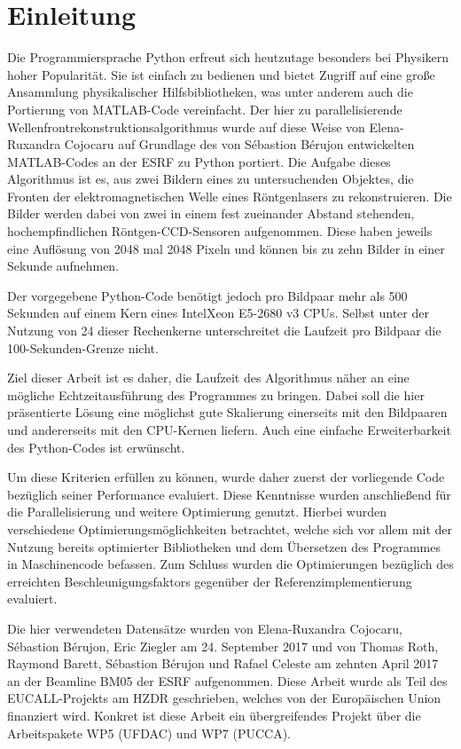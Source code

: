 \chapter{Einleitung}

Die Programmiersprache Python erfreut sich heutzutage besonders bei Physikern hoher Popularität. Sie ist einfach zu bedienen und bietet Zugriff auf eine große Ansammlung physikalischer Hilfsbibliotheken, was unter anderem auch die Portierung von MATLAB-Code vereinfacht. Der hier zu parallelisierende Wellenfrontrekonstruktionsalgorithmus wurde auf diese Weise von Elena-Ruxandra Cojocaru auf Grundlage des von Sébastion Bérujon entwickelten MATLAB-Codes an der \gls{ESRF} zu Python portiert. Die Aufgabe dieses Algorithmus ist es, aus zwei Bildern eines zu untersuchenden Objektes, die Fronten der elektromagnetischen Welle eines Röntgenlasers zu rekonstruieren. Die Bilder werden dabei von zwei in einem fest zueinander Abstand stehenden, hochempfindlichen Röntgen-\gls{CCD}-Sensoren aufgenommen. Diese haben jeweils eine Auflösung von 2048 mal 2048 Pixeln und können bis zu zehn Bilder in einer Sekunde aufnehmen. 

Der vorgegebene Python-Code benötigt jedoch pro Bildpaar mehr als 500 Sekunden auf einem Kern eines Intel\textregistered \mbox{Xeon\textregistered} E5-2680 v3 \glspl{CPU}. Selbst unter der Nutzung von 24 dieser Rechenkerne unterschreitet die Laufzeit pro Bildpaar die 100-Sekunden-Grenze nicht.

Ziel dieser Arbeit ist es daher, die Laufzeit des Algorithmus näher an eine mögliche Echtzeitausführung des Programmes zu bringen. Dabei soll die hier präsentierte Lösung eine möglichst gute Skalierung einerseits mit den Bildpaaren und andererseits mit den \gls{CPU}-Kernen liefern. Auch eine einfache Erweiterbarkeit des Python-Codes ist erwünscht. 

Um diese Kriterien erfüllen zu können, wurde daher zuerst der vorliegende Code bezüglich seiner Performance evaluiert. Diese Kenntnisse wurden anschließend für die Parallelisierung und weitere Optimierung genutzt. Hierbei wurden verschiedene Optimierungsmöglichkeiten betrachtet, welche sich vor allem mit der Nutzung bereits optimierter Bibliotheken und dem Übersetzen des Programmes in Maschinencode befassen. Zum Schluss wurden die Optimierungen bezüglich des erreichten Beschleunigungsfaktors gegenüber der Referenzimplementierung evaluiert.

Die hier verwendeten Datensätze wurden von Elena-Ruxandra Cojocaru, Sébastion Bérujon, Eric Ziegler am 24. September 2017 und von Thomas Roth, Raymond Barett, Sébastion Bérujon und Rafael Celeste am zehnten April 2017 an der Beamline BM05 der \gls{ESRF} aufgenommen. Diese Arbeit wurde als Teil des \gls{EUCALL}-Projekts am \gls{HZDR} geschrieben, welches von der Europäischen Union finanziert wird. Konkret ist diese Arbeit ein übergreifendes Projekt über die Arbeitspakete WP5 (\gls{UFDAC}) und WP7 (\gls{PUCCA}). 